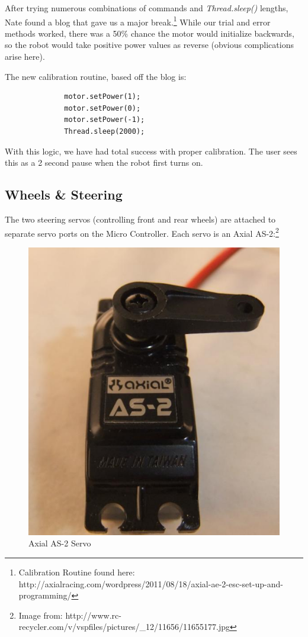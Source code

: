 \documentclass[12pt]{article}
\begin{document}
After trying numerous combinations of commands and \textit{Thread.sleep()} lengths, Nate found a blog that gave us a major break.\footnote{Calibration Routine found here: http://axialracing.com/wordpress/2011/08/18/axial-ae-2-esc-set-up-and-programming/}  While our trial and error methods worked, there was a 50\% chance the motor would initialize backwards, so the robot would take positive power values as reverse (obvious complications arise here).

The new calibration routine, based off the blog is:
\begin{verbatim}
              motor.setPower(1);
              motor.setPower(0);
              motor.setPower(-1);
              Thread.sleep(2000);
\end{verbatim}
With this logic, we have had total success with proper calibration.  The user sees this as a 2 second pause when the robot first turns on.

\clearpage
\subsection{Wheels \& Steering}
The two steering servos (controlling front and rear wheels) are attached to separate servo ports on the Micro Controller.  Each servo is an Axial AS-2:\footnote{Image from: http://www.rc-recycler.com/v/vspfiles/pictures/\_12/11656/11655177.jpg}
\begin{figure}[h]
\centerline{\includegraphics[scale=.75, angle=270]{img/as2}}
\caption{Axial AS-2 Servo}
\end{figure}
\end{document}
